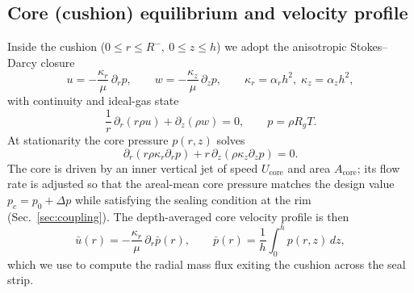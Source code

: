 \documentclass[11pt,a4paper]{article}
\begin{document}
\subsection{Core (cushion) equilibrium and velocity profile}
Inside the cushion ($0\le r\le R^{-},\ 0\le z\le h$) we adopt the anisotropic Stokes--Darcy closure
\begin{equation}
  u = -\frac{\kappa_r}{\mu}\,\partial_r p,\qquad
  w = -\frac{\kappa_z}{\mu}\,\partial_z p,\qquad 
  \kappa_r=\alpha_r h^2,\;\kappa_z=\alpha_z h^2,
\end{equation}
with continuity and ideal-gas state
\begin{equation}
  \frac{1}{r}\,\partial_r\!\left(r\rho u\right)+\partial_z(\rho w)=0,\qquad
  p=\rho R_g T .
\end{equation}
At stationarity the core pressure $p(r,z)$ solves
\begin{equation}
  \partial_r\!\left(r\rho\kappa_r\partial_r p\right)+r\,\partial_z\!\left(\rho\kappa_z\partial_z p\right)=0.
\end{equation}
The core is driven by an inner vertical jet of speed $U_{\mathrm{core}}$ and area $A_{\mathrm{core}}$; its flow rate is adjusted so that the areal-mean core pressure matches the design value $p_c=p_0+\Delta p$ while satisfying the sealing condition at the rim (Sec.~\ref{sec:coupling}). The depth-averaged core velocity profile is then
\begin{equation}
  \bar u(r) = -\frac{\kappa_r}{\mu}\,\partial_r \bar p(r),\qquad 
  \bar p(r)=\frac1h\int_0^h p(r,z)\,dz ,
\end{equation}
which we use to compute the radial mass flux exiting the cushion across the seal strip.
\end{document}
